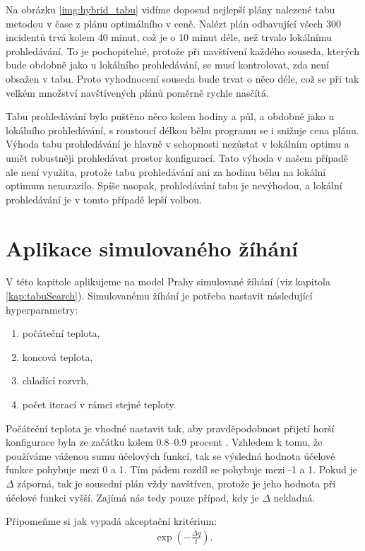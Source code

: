 Na obrázku \ref{img:hybrid_tabu} vidíme doposud nejlepší plány nalezené tabu metodou v čase z plánu optimálního v ceně.
Nalézt plán odbavující všech 300 incidentů trvá kolem 40 minut, což je o 10 minut déle, než trvalo lokálnímu prohledávání. 
To je pochopitelné, protože při navštívení každého souseda, kterých bude obdobně jako u lokálního prohledávání, se musí kontrolovat,
zda není obsažen v tabu. Proto vyhodnocení souseda bude trvat o něco déle, což se při tak velkém množství navštívených plánů poměrně rychle nasčítá.

Tabu prohledávání bylo puštěno něco kolem hodiny a půl, a obdobně jako u lokálního prohledávání, s roustoucí délkou běhu programu se i snižuje cena plánu.
Výhoda tabu prohledávání je hlavně v schopnosti nezůstat v lokálním optimu a umět robustněji prohledávat prostor konfigurací.
Tato výhoda v našem případě ale není využita, protože tabu prohledávání ani za hodinu běhu na lokální optimum nenarazilo.
Spíše naopak, prohledávání tabu je nevýhodou, a lokální prohledávání je v tomto případě lepší volbou.

\section{Aplikace simulovaného žíhání}

V této kapitole aplikujeme na model Prahy simulované žíhání (viz kapitola \ref{kap:tabuSearch}).
Simulovanému žíhání je potřeba nastavit následující hyperparametry:
\begin{enumerate}
  \item počáteční teplota,
  \item koncová teplota,
  \item chladící rozvrh,
  \item počet iterací v rámci stejné teploty.
\end{enumerate}

Počáteční teplota je vhodné nastavit tak, aby pravděpodobnost přijetí horší konfigurace byla ze začátku kolem 0.8--0.9 procent \cite{sa_theory}.
Vzhledem k tomu, že používáme váženou sumu účelových funkcí, tak se výsledná hodnota účelové funkce pohybuje mezi 0 a 1.
Tím pádem rozdíl se pohybuje mezi -1 a 1.
Pokud je $\Delta$ záporná, tak je sousední plán vždy navštíven, protože je
jeho hodnota při účelové funkci vyšší. Zajímá nás tedy pouze případ, kdy je $\Delta$ nekladná.

Připomeňme si jak vypadá akceptační kritérium:
\begin{align*}\label{df:metropolis}
  \exp\left(-\frac{\Delta q}{t}\right).
\end{align*}

